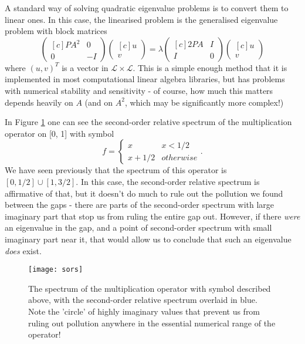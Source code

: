 \documentclass[../main.tex]{subfiles}
\begin{document}
A standard way of solving quadratic eigenvalue problems is to convert them to linear ones. In
this case, the linearised problem is the generalised eigenvalue problem with block matrices
  $$
  \begin{pmatrix*}[c]
    PA^2 &  0 \\
    0    & -I
  \end{pmatrix*}
  \begin{pmatrix*}[c]
    u \\ v
  \end{pmatrix*}
  =
  \lambda
  \begin{pmatrix*}[c]
    2PA & I \\
    I   & 0
  \end{pmatrix*}
  \begin{pmatrix*}[c]
    u \\ v
  \end{pmatrix*}
  $$
where $(u, v)^T$ is a vector in $\mathcal{L} \times \mathcal{L}$. This is a simple enough method that
it is implemented in most computational linear algebra libraries, but has problems with numerical
stability and sensitivity \cite{higham2008scaling} - of course, how much this matters depends
heavily on $A$ (and on $A^2$, which may be significantly more complex!)

In Figure \ref{fig:sors-mult} one can see the second-order relative spectrum of the multiplication
operator on [0, 1] with symbol
$$f =
\begin{cases}
  x & x < 1/2 \\
  x + 1/2 & otherwise
\end{cases}.
$$
We have seen previously that the spectrum of this operator is $[0, 1/2] \cup [1, 3/2]$. In this case,
the second-order relative spectrum is affirmative of that, but it doesn't do much to rule out the
pollution we found between the gaps - there are parts of the second-order spectrum with large imaginary
part that stop us from ruling the entire gap out. However, if there \emph{were} an eigenvalue in the gap,
and a point of second-order spectrum with small imaginary part near it, that would allow us to conclude that
such an eigenvalue \emph{does} exist.

\begin{figure}[h!]
\centering
  \texttt{[image: sors]}
  \caption{The spectrum of the multiplication operator with symbol described above, with the second-order
  relative spectrum overlaid in blue. Note the 'circle' of highly imaginary values that prevent us from
  ruling out pollution anywhere in the essential numerical range of the operator!}
  \label{fig:sors-mult}
\end{figure}
\end{document}
